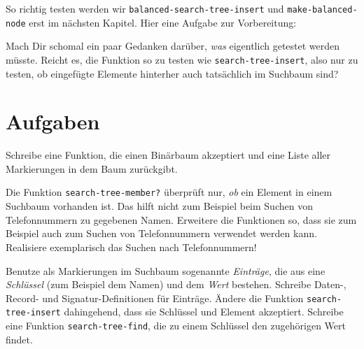 \mantrakomplexitaet*

\noindent So richtig testen werden wir \lstinline{balanced-search-tree-insert} und
\lstinline{make-balanced-node} erst im nächsten Kapitel.  Hier
eine Aufgabe zur Vorbereitung:
  
\begin{aufgabeinline}
  Mach Dir schomal ein paar Gedanken darüber, \emph{was} eigentlich
  getestet werden müsste.  Reicht es, die Funktion so zu testen wie
  \lstinline{search-tree-insert}, also nur zu testen, ob eingefügte
  Elemente hinterher auch tatsächlich im Suchbaum sind?
\end{aufgabeinline}

\section*{Aufgaben}

\begin{aufgabe}
  Schreibe eine Funktion, die einen Binärbaum akzeptiert
  und eine Liste aller Markierungen in dem Baum zurückgibt.
\end{aufgabe}


\begin{aufgabe}
  Die Funktion \texttt{search-tree-member?} überprüft nur,
  \emph{ob} ein Element in einem Suchbaum vorhanden ist.  Das hilft
  nicht zum Beispiel beim Suchen von Telefonnummern zu gegebenen Namen.
  Erweitere die Funktionen so, dass sie zum Beispiel auch zum Suchen
  von Telefonnummern verwendet werden kann.  Realisiere 
  exemplarisch das Suchen nach Telefonnummern!

  Benutze als Markierungen im Suchbaum sogenannte
  \textit{Einträge}, die aus eine \textit{Schlüssel} (zum Beispiel dem Namen)
  und dem \textit{Wert} bestehen.  Schreibe Daten-,
  Record- und Signatur-Definitionen für Einträge. Ändere die Funktion \texttt{search-tree-insert}
  dahingehend, dass sie Schlüssel und Element akzeptiert.  Schreibe eine
  Funktion \texttt{search-tree-find}, die zu einem Schlüssel den
  zugehörigen Wert findet.
\end{aufgabe}


